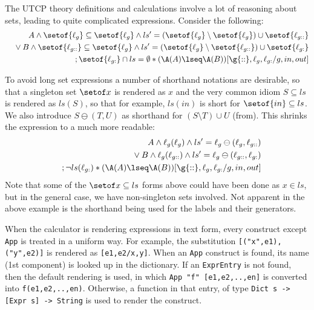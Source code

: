 The UTCP theory definitions and calculations
involve a lot of reasoning about sets,
leading to quite complicated expressions.
Consider the following:
\begin{eqnarray*}
  && A \land \setof{\ell_{g}} \subseteq \setof{\ell_{g}}
  \land ls'
    = (\setof{\ell_{g}} \setminus \setof{\ell_{g}}) 
      \cup\setof{\ell_{g::}}
\\&& {} \lor B \land \setof{\ell_{g::}} \subseteq \setof{\ell_{g}}
  \land ls' = 
  (\setof{\ell_{g}} \setminus \setof{\ell_{g::}}) 
   \cup \setof{\ell_{g:}}
\\&& {} ; \setof{\ell_{g:}} \cap ls = \emptyset * (\A(A) \lseq \A(B))[\g{::},\ell_{g},\ell_{g:}/g,in,out]
\end{eqnarray*}

To avoid long set expressions a number of shorthand notations are desirable,
so that a singleton set $\setof x$ is rendered as $x$
and the very common idiom $S \subseteq ls$
is rendered as $ls(S)$,
so that for example, $ls(in)$ is short for $\setof{in} \subseteq ls$.
We also introduce $S \ominus (T,U)$ as shorthand for $(S \setminus T) \cup U$
(from\cite{DBLP:conf/icfem/WoodcockH02}).
This shrinks the expression to a much more readable:
\begin{eqnarray*}
  && A \land \ell_{g}(\ell_{g}) \land ls' = \ell_{g} \ominus (\ell_{g},\ell_{g::})
\\&& {} \lor B \land \ell_{g}(\ell_{g::}) \land ls' = \ell_{g} \ominus (\ell_{g::},\ell_{g:})
\\&& {} ; \lnot ls(\ell_{g:}) * (\A(A) \lseq \A(B))[\g{::},\ell_{g},\ell_{g:}/g,in,out]
\end{eqnarray*}
Note that some of the $\setof x \subseteq ls$ forms above
could have been done as $x \in ls$, but in the general case,
we have non-singleton sets involved.
Not apparent in the above example is the shorthand being used for the labels
and their generators.


When the calculator is rendering expressions in text form,
every construct except \texttt{App} is treated in a uniform way.
For example, the substitution \verb$[("x",e1),("y",e2)]$
is rendered as \verb$[e1,e2/x,y]$.
When an \texttt{App} construct is found, its name (1st component)
is looked up in the dictionary.
If an \texttt{ExprEntry} is not found, then the default rendering is used,
in which \verb$App "f" [e1,e2,..,en]$
is converted into \verb$f(e1,e2,..,en)$.
Otherwise, a function in that entry,
of type \verb$Dict s -> [Expr s] -> String$
is used to render the construct.

